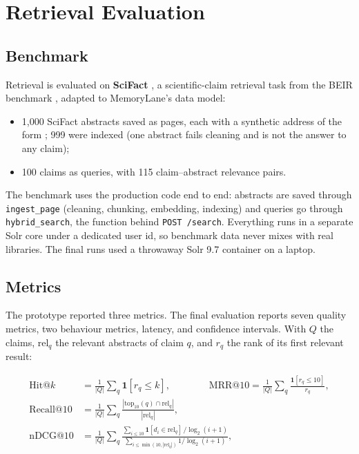 
\chapter{Retrieval Evaluation}
\label{ch:evaluation}

\section{Benchmark}

Retrieval is evaluated on \textbf{SciFact} \cite{wadden2020scifact}, a
scientific-claim retrieval task from the BEIR benchmark
\cite{thakur2021beir}, adapted to MemoryLane's data model:

\begin{itemize}
  \item 1{,}000 SciFact abstracts saved as pages, each with a synthetic
  address of the form ; 999 were indexed
  (one abstract fails cleaning and is not the answer to any claim);
  \item 100 claims as queries, with 115 claim--abstract relevance pairs.
\end{itemize}

The benchmark uses the production code end to end: abstracts are saved
through \texttt{ingest\_page} (cleaning, chunking, embedding, indexing) and
queries go through \texttt{hybrid\_search}, the function behind
\texttt{POST /search}. Everything runs in a separate Solr core under a
dedicated user id, so benchmark data never mixes with real libraries. The
final runs used a throwaway Solr 9.7 container on a laptop.

\section{Metrics}

The prototype reported three metrics. The final evaluation reports seven
quality metrics, two behaviour metrics, latency, and confidence intervals.
With $Q$ the claims, $\text{rel}_q$ the relevant abstracts of claim $q$, and
$r_q$ the rank of its first relevant result:

\begin{align*}
\text{Hit@}k &= \frac{1}{|Q|}\sum_{q} \mathbf{1}[r_q \leq k],
\qquad\qquad
\text{MRR@10} = \frac{1}{|Q|}\sum_{q} \frac{\mathbf{1}[r_q \le 10]}{r_q}, \\[2mm]
\text{Recall@10} &= \frac{1}{|Q|}\sum_{q} \frac{|\text{top}_{10}(q) \cap \text{rel}_q|}{|\text{rel}_q|}, \\[2mm]
\text{nDCG@10} &= \frac{1}{|Q|}\sum_{q}\frac{\sum_{i \le 10} \mathbf{1}[d_i \in \text{rel}_q]\,/\log_2(i+1)}{\sum_{i \le \min(10,|\text{rel}_q|)} 1/\log_2(i+1)},
\end{align*}

